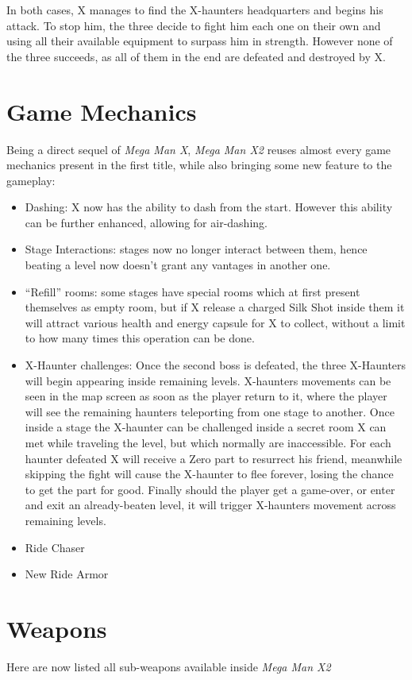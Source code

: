 In both cases, X manages to find the X-haunters headquarters and begins his attack. To stop him, the three decide to fight him each one on their own and using all their available equipment to surpass him in strength. However none of the three succeeds, as all of them in the end are defeated and destroyed by X.


\section{Game Mechanics}
Being a direct sequel of \textit{Mega Man X}, \textit{Mega Man X2} reuses almost every game mechanics present in the first title, while also bringing some new feature to the gameplay:
\begin{itemize}
	\item Dashing: X now has the ability to dash from the start. However this ability can be further enhanced, allowing for air-dashing.
	\item Stage Interactions: stages now no longer interact between them, hence beating a level now doesn't grant any vantages in another one.
	\item ``Refill'' rooms: some stages have special rooms which at first present themselves as empty room, but if X release a charged Silk Shot inside them it will attract various health and energy capsule for X to collect, without a limit to how many times this operation can be done.
	\item X-Haunter challenges: Once the second boss is defeated, the three X-Haunters will begin appearing inside remaining levels. X-haunters movements can be seen in the map screen as soon as the player return to it, where the player will see the remaining haunters teleporting from one stage to another. Once inside a stage the X-haunter can be challenged inside a secret room X can met while traveling the level, but which normally are inaccessible. For each haunter defeated X will receive a Zero part to resurrect his friend, meanwhile skipping the fight will cause the X-haunter to flee forever, losing the chance to get the part for good. Finally should the player get a game-over, or enter and exit an already-beaten level, it will trigger X-haunters movement across remaining levels.
	\item Ride Chaser %
	\item New Ride Armor
\end{itemize}

\section{Weapons}\label{X2:sub_weapon}
Here are now listed all sub-weapons available inside \textit{Mega Man X2}~\cite{wiki:X_weapons}

